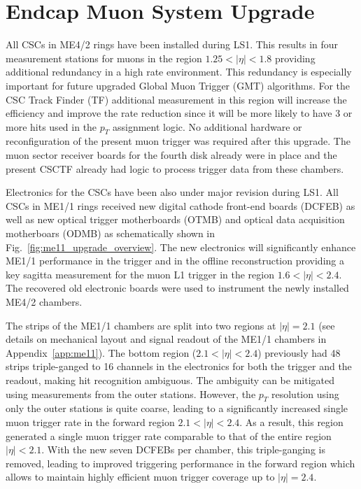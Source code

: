 \section{Endcap Muon System Upgrade}
\label{sec:csc_upgrade}

All CSCs in ME4/2 rings have been installed during LS1. This results in four measurement stations for muons in the region $1.25 < |\eta| < 1.8$ providing additional redundancy in a high rate environment. This redundancy is especially important for future upgraded Global Muon Trigger (GMT) algorithms. For the CSC Track Finder (TF) additional measurement in this region will increase the efficiency and improve the rate reduction since it will be more likely to have 3 or more hits used in the $p_T$ assignment logic. No additional hardware or reconfiguration of the present muon trigger was required after this upgrade. The muon sector receiver boards for the fourth disk already were in place and the present CSCTF already had logic to process trigger data from these chambers.

Electronics for the CSCs have been also under major revision during LS1. All CSCs in ME1/1 rings received new digital cathode front-end boards (DCFEB) as well as new optical trigger motherboards (OTMB) and optical data acquisition motherboars (ODMB) as schematically shown in Fig.~\ref{fig:me11_upgrade_overview}. The new electronics will significantly enhance ME1/1 performance in the trigger and in the offline reconstruction providing a key sagitta measurement for the muon L1 trigger in the region $1.6 < |\eta| < 2.4$. The recovered old electronic boards were used to instrument the newly installed ME4/2 chambers.

The strips of the ME1/1 chambers are split into two regions at $|\eta| = 2.1$ (see details on mechanical layout and signal readout of the ME1/1 chambers in Appendix~\ref{app:me11}). The bottom region ($2.1 < |\eta| < 2.4$) previously had 48 strips triple-ganged to 16 channels in the electronics for both the trigger and the readout, making hit recognition ambiguous. The ambiguity can be mitigated using measurements from the outer stations. However, the $p_T$ resolution using only the outer stations is quite coarse, leading to a significantly increased single muon trigger rate in the forward region $2.1<|\eta|<2.4$. As a result, this region generated a single muon trigger rate comparable to that of the entire region $|\eta| < 2.1$. With the new seven DCFEBs per chamber, this triple-ganging is removed, leading to improved triggering performance in the forward region which allows to maintain highly efficient muon trigger coverage up to $|\eta| = 2.4$.


